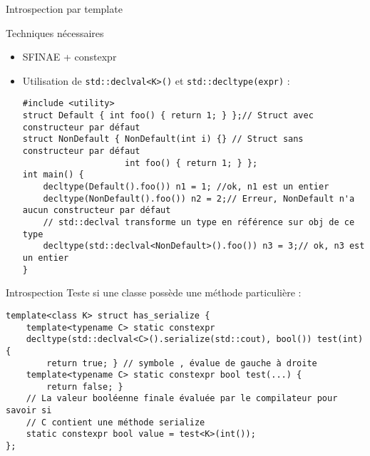 \documentclass[handout,10pt]{beamer}
\begin{document}
\begin{frame}[fragile]{Introspection par template}
\tiny
\begin{block}{Techniques nécessaires}
\begin{itemize}
\item SFINAE + constexpr
\item Utilisation de \lstinline$std::declval<K>()$ et \lstinline$std::decltype(expr)$ :
\begin{lstlisting}
#include <utility>
struct Default { int foo() { return 1; } };// Struct avec constructeur par défaut
struct NonDefault { NonDefault(int i) {} // Struct sans constructeur par défaut
                    int foo() { return 1; } };
int main() {
    decltype(Default().foo()) n1 = 1; //ok, n1 est un entier
    decltype(NonDefault().foo()) n2 = 2;// Erreur, NonDefault n'a aucun constructeur par défaut
    // std::declval transforme un type en référence sur obj de ce type
    decltype(std::declval<NonDefault>().foo()) n3 = 3;// ok, n3 est un entier
}
\end{lstlisting}
\end{itemize}
\end{block}
\begin{exampleblock}{Introspection}
Teste si une classe possède une méthode particulière :
\begin{lstlisting}
template<class K> struct has_serialize {
    template<typename C> static constexpr 
    decltype(std::declval<C>().serialize(std::cout), bool()) test(int){
        return true; } // symbole , évalue de gauche à droite
    template<typename C> static constexpr bool test(...) {
        return false; }
    // La valeur booléenne finale évaluée par le compilateur pour savoir si 
    // C contient une méthode serialize
    static constexpr bool value = test<K>(int());
};
\end{lstlisting}
\end{exampleblock}
\end{frame}
\end{document}
